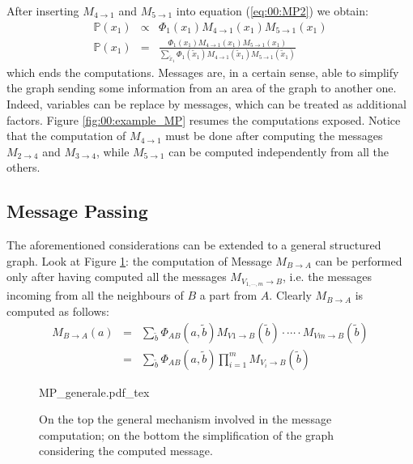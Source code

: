 After inserting $M _{4 \rightarrow 1}$ and $M _{5 \rightarrow 1}$ into equation (\ref{eq:00:MP2}) we obtain:
\begin{eqnarray}
\mathbb{P}(x_1) & \propto &
\Phi _{1}(x_1) 
M _{4 \rightarrow 1}(x_1)
M _{5 \rightarrow 1}(x_1) \nonumber\\
\mathbb{P}(x_1) &=&
\frac{\Phi _{1}(x_1) 
M _{4 \rightarrow 1}(x_1)
M _{5 \rightarrow 1}(x_1)}{
\sum_{\tilde{x}_1}
\Phi _{1}(\tilde{x}_1) 
M _{4 \rightarrow 1}(\tilde{x}_1)
M _{5 \rightarrow 1}(\tilde{x}_1)
}
\label{eq:00:MP3}
\end{eqnarray}
which ends the computations.
Messages are, in a certain sense, able to simplify the graph sending some information from an area of the graph to another one. Indeed, variables can be replace by messages, which can be treated as additional factors. 
Figure \ref{fig:00:example_MP} resumes the computations exposed.
Notice that the computation of $M _{4 \rightarrow 1}$ must be done after computing  the messages $M _{2 \rightarrow 4}$  and $M _{3 \rightarrow 4}$, while $M _{5 \rightarrow 1}$ can be computed independently from all the others.

\subsection{Message Passing}
\label{sec:00:MP}

The aforementioned considerations can be extended to a general structured graph.
Look at Figure \ref{fig:00:general_MP}: the computation of Message $M _{B \rightarrow A}$ can be performed only after having computed all the messages $M _{V_{1,\cdots,m} \rightarrow B}$, i.e. the messages incoming from all the neighbours of $B$ a part from $A$. Clearly $M _{B \rightarrow A}$ is computed as follows:
\begin{eqnarray}
M _{B \rightarrow A}(a) &=& 
\sum _{\tilde{b}} \Phi _{AB}(a, \tilde{b})
M _{V1 \rightarrow B}(\tilde{b}) \cdot \cdots \cdot 
M _{Vm \rightarrow B}(\tilde{b}) \nonumber\\
&=& \sum_{\tilde{b}} \Phi_{AB}(a, \tilde{b}) \prod_{i=1}^{m} M_{V_i \rightarrow B}(\tilde{b})
\label{eq:00:MP_general}
\end{eqnarray}

\begin{figure}
	\centering
\def\svgwidth{0.95 \textwidth}
{MP_generale.pdf_tex}
	\caption{On the top the general mechanism involved in the message computation; on the bottom the simplification of the graph considering the computed message.}
	\label{fig:00:general_MP}
\end{figure} 

